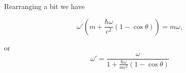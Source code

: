 Rearranging a bit we have

\begin{equation}\label{eqn:relativisticElectrodynamicsExamReflection:n}
\omega' \left( m + \frac{\hbar \omega}{c^2} ( 1 - \cos\theta ) \right) = m \omega,
\end{equation}

or
\begin{equation}\label{eqn:relativisticElectrodynamicsExamReflection:n}
\omega' = \frac{\omega}{
1 + \frac{\hbar \omega}{m c^2} ( 1 - \cos\theta ) 
}
\end{equation}

\EndNoBibArticle
